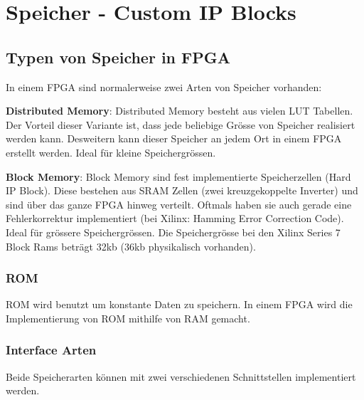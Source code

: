 \section{Speicher - Custom IP Blocks}
\subsection{Typen von Speicher in FPGA}
In einem FPGA sind normalerweise zwei Arten von Speicher vorhanden:
\begin{compactitem}
    \item \textbf{Distributed Memory}: Distributed Memory besteht aus vielen LUT Tabellen. Der Vorteil dieser Variante ist, dass jede beliebige Grösse von Speicher realisiert werden kann. Desweitern kann dieser Speicher an jedem Ort in einem FPGA erstellt werden. Ideal für kleine Speichergrössen.
    \item \textbf{Block Memory}: Block Memory sind fest implementierte Speicherzellen (Hard IP Block). Diese bestehen aus SRAM Zellen (zwei kreuzgekoppelte Inverter) und sind über das ganze FPGA hinweg verteilt. Oftmals haben sie auch gerade eine Fehlerkorrektur implementiert (bei Xilinx: Hamming Error Correction Code). Ideal für grössere Speichergrössen. Die Speichergrösse bei den Xilinx Series 7 Block Rams beträgt 32kb (36kb physikalisch vorhanden).
\end{compactitem}

\subsubsection{ROM}
ROM wird benutzt um konstante Daten zu speichern. In einem FPGA wird die Implementierung von ROM mithilfe von RAM gemacht.

\subsubsection{Interface Arten}
Beide Speicherarten können mit zwei verschiedenen Schnittstellen implementiert werden.

